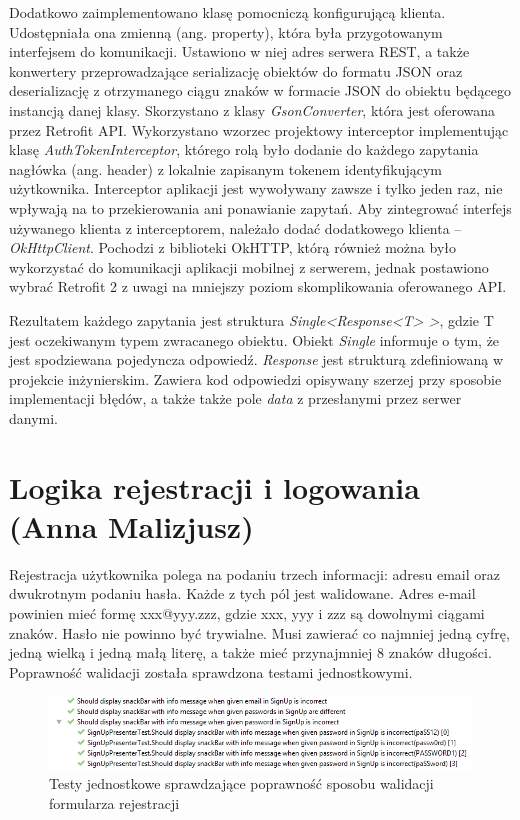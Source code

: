 \documentclass[10pt,twoside,a4paper]{report}
\begin{document}
\par Dodatkowo zaimplementowano klasę pomocniczą konfigurującą klienta. Udostępniała ona zmienną (ang. property), która była przygotowanym interfejsem do komunikacji. Ustawiono w niej adres serwera REST, a także konwertery przeprowadzające serializację obiektów do formatu JSON oraz deserializację z otrzymanego ciągu znaków w formacie JSON do obiektu będącego instancją danej klasy. Skorzystano z klasy \textit{GsonConverter}, która jest oferowana przez Retrofit API. Wykorzystano wzorzec projektowy interceptor implementując klasę \textit{AuthTokenInterceptor}, którego rolą było dodanie do każdego zapytania nagłówka (ang. header) z lokalnie zapisanym tokenem identyfikującym użytkownika. Interceptor aplikacji jest wywoływany zawsze i tylko jeden raz, nie wpływają na to przekierowania ani ponawianie zapytań. Aby zintegrować interfejs używanego klienta z interceptorem, należało dodać dodatkowego klienta -- \textit{OkHttpClient}\cite{OkHttpClient}. Pochodzi z biblioteki OkHTTP, którą również można było wykorzystać do komunikacji aplikacji mobilnej z serwerem, jednak postawiono wybrać Retrofit 2 z uwagi na mniejszy poziom skomplikowania oferowanego API.

\par Rezultatem każdego zapytania jest struktura \textit{Single<Response<T> >}, gdzie T jest oczekiwanym typem zwracanego obiektu. Obiekt \textit{Single} informuje o tym, że jest spodziewana pojedyncza odpowiedź. \textit{Response} jest strukturą zdefiniowaną w projekcie inżynierskim. Zawiera kod odpowiedzi opisywany szerzej przy sposobie implementacji błędów, a także także pole \textit{data} z przesłanymi przez serwer danymi.


\section{Logika rejestracji i logowania (Anna Malizjusz)}
\par Rejestracja użytkownika polega na podaniu trzech informacji: adresu email oraz dwukrotnym podaniu hasła. Każde z tych pól jest walidowane. Adres e-mail powinien mieć formę xxx@yyy.zzz, gdzie xxx, yyy i zzz są dowolnymi ciągami znaków. Hasło nie powinno być trywialne. Musi zawierać co najmniej jedną cyfrę, jedną wielką i jedną małą literę, a także mieć przynajmniej 8 znaków długości. Poprawność walidacji została sprawdzona testami jednostkowymi.

\begin{figure}[h]
\centering
\includegraphics[width=\linewidth]{registerUnitTestResult}
\caption{Testy jednostkowe sprawdzające poprawność sposobu walidacji formularza rejestracji}
\label{fig:tokenPayload}
\end{figure}
\FloatBarrier
\end{document}
